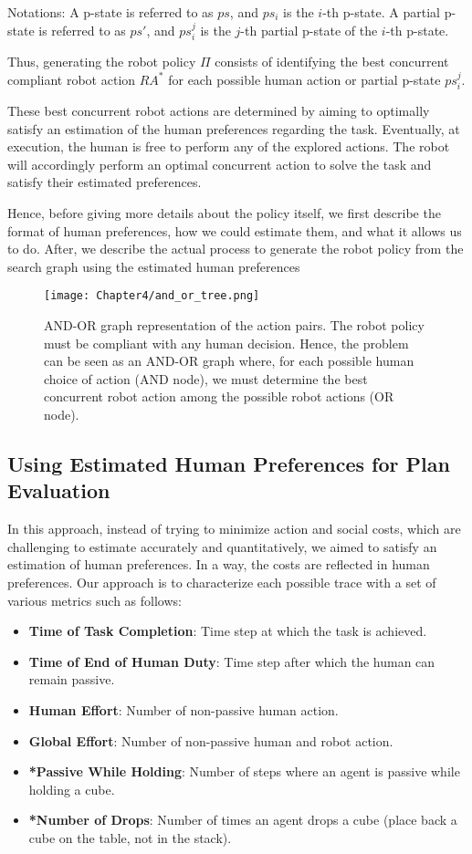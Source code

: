 Notations: A p-state is referred to as $ps$, and $ps_i$ is the $i$-th p-state. A partial p-state is referred to as $ps'$, and $ps_i^j$ is the $j$-th partial p-state of the $i$-th p-state.

Thus, generating the robot policy $\Pi$ consists of identifying the best concurrent compliant robot action $RA^*$ for each possible human action or partial p-state $ps_i^j$.

These best concurrent robot actions are determined by aiming to optimally satisfy an estimation of the human preferences regarding the task. Eventually, at execution, the human is free to perform any of the explored actions. The robot will accordingly perform an optimal concurrent action to solve the task and satisfy their estimated preferences.

Hence, before giving more details about the policy itself, we first describe the format of human preferences, how we could estimate them, and what it allows us to do. After, we describe the actual process to generate the robot policy from the search graph using the estimated human preferences


\begin{figure}
    \texttt{[image: Chapter4/and\_or\_tree.png]}
    \caption{AND-OR graph representation of the action pairs. 
    The robot policy must be compliant with any human decision. Hence, the problem can be seen as an AND-OR graph where, for each possible human choice of action (AND node), we must determine the best concurrent robot action among the possible robot actions (OR node).
    }
    \label{fig:and_or}
\end{figure}


    \subsection{Using Estimated Human Preferences for Plan Evaluation}

In this approach, instead of trying to minimize action and social costs, which are challenging to estimate accurately and quantitatively, we aimed to satisfy an estimation of human preferences. In a way, the costs are reflected in human preferences. Our approach is to characterize each possible trace with a set of various metrics such as follows:

\begin{itemize}
    \item \textbf{Time of Task Completion}: Time step at which the task is achieved.
    \item \textbf{Time of End of Human Duty}: Time step after which the human can remain passive.
    \item \textbf{Human Effort}: Number of non-passive human action.
    \item \textbf{Global Effort}: Number of non-passive human and robot action.
    \item \textbf{*Passive While Holding}: Number of steps where an agent is passive while holding a cube.
    \item \textbf{*Number of Drops}: Number of times an agent drops a cube (place back a cube on the table, not in the stack).
\end{itemize}

